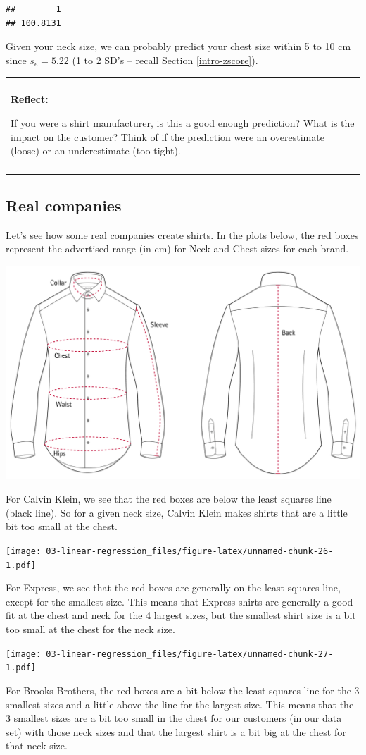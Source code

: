\documentclass[
]{book}
\newenvironment{reflect}
{
    \begin{center}
    
    \begin{tabular}{|p{0.8\textwidth}|}
    \rowcolor{LightBlue}
    \hline\\
    \rowcolor{LightBlue}
    \textbf{Reflect:}
}
{
    \\\rowcolor{LightBlue}
    \\\hline
    \end{tabular} 
    \end{center}
}
\begin{document}
\begin{verbatim}
##        1 
## 100.8131
\end{verbatim}

Given your neck size, we can probably predict your chest size within 5 to 10 cm since \(s_e = 5.22\) (1 to 2 SD's -- recall Section \ref{intro-zscore}).

\begin{reflect}
If you were a shirt manufacturer, is this a good enough prediction? What
is the impact on the customer? Think of if the prediction were an
overestimate (loose) or an underestimate (too tight).
\end{reflect}

\hypertarget{real-companies}{%
\subsection{Real companies}\label{real-companies}}

Let's see how some real companies create shirts. In the plots below, the red boxes represent the advertised range (in cm) for Neck and Chest sizes for each brand.

\includegraphics[width=.25\textwidth]{Photos/shirtchart}

For Calvin Klein, we see that the red boxes are below the least squares line (black line). So for a given neck size, Calvin Klein makes shirts that are a little bit too small at the chest.

\texttt{[image: 03-linear-regression\_files/figure-latex/unnamed-chunk-26-1.pdf]}

For Express, we see that the red boxes are generally on the least squares line, except for the smallest size. This means that Express shirts are generally a good fit at the chest and neck for the 4 largest sizes, but the smallest shirt size is a bit too small at the chest for the neck size.

\texttt{[image: 03-linear-regression\_files/figure-latex/unnamed-chunk-27-1.pdf]}

For Brooks Brothers, the red boxes are a bit below the least squares line for the 3 smallest sizes and a little above the line for the largest size. This means that the 3 smallest sizes are a bit too small in the chest for our customers (in our data set) with those neck sizes and that the largest shirt is a bit big at the chest for that neck size.
\end{document}
